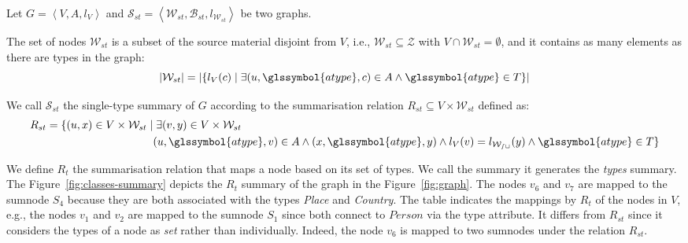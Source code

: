 \begin{definition}
Let $G=\left\langle V, A, l_V \right\rangle$ and $\mathcal{S}_{st} = \left\langle \mathcal{W}_{st}, \mathcal{B}_{st}, l_{\mathcal{W}_{st}} \right\rangle$ be two graphs.

The set of nodes $\mathcal{W}_{st}$ is a subset of the source material disjoint from $V$, i.e., $\mathcal{W}_{st} \subseteq \mathcal{Z}$ with $V \cap \mathcal{W}_{st} = \emptyset$, and it contains as many elements as there are types in the graph:
$$
\lvert \mathcal{W}_{st} \rvert = \lvert \left\lbrace l_V(c) \mid \exists (u, \glssymbol{atype}, c) \in A \wedge \glssymbol{atype} \in T \right\rbrace \rvert
$$

We call $\mathcal{S}_{st}$ the single-type summary of $G$ according to the summarisation relation $R_{st} \subseteq V \times \mathcal{W}_{st}$ defined as:
$$
\begin{aligned}
R_{st} = \{ (u, x) \in V \times \mathcal{W}_{st} \mid &\; \exists (v, y) \in V \times \mathcal{W}_{st} \\
	& (u,\glssymbol{atype},v) \in A \wedge (x,\glssymbol{atype},y) \wedge l_V(v) = l_\mathcal{W_{st}}(y) \wedge \glssymbol{atype} \in T \}
\end{aligned}
$$
\label{def:st}
\end{definition}
\vspace{.5cm}


We define $R_t$ the summarisation relation that maps a node based on its set of types. We call the summary it generates the \emph{types} summary.
The Figure~\ref{fig:classes-summary} depicts the $R_t$ summary of the graph in the Figure~\ref{fig:graph}. The nodes $v_6$ and $v_7$ are mapped to the sumnode $S_4$ because they are both associated with the types \emph{Place} and \emph{Country}. The table indicates the mappings by $R_t$ of the nodes in $V$, e.g., the nodes $v_1$ and $v_2$ are mapped to the sumnode $S_1$ since both connect to $Person$ via the type attribute. It differs from $R_{st}$ since it considers the types of a node as \emph{set} rather than individually. Indeed, the node $v_6$ is mapped to two sumnodes under the relation $R_{st}$.

